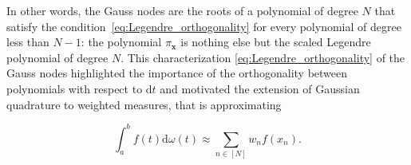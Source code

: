 \documentclass[twoside,11pt]{book}
\numberwithin{theorem}{chapter}
\numberwithin{definition}{chapter}
\numberwithin{proposition}{chapter}
\numberwithin{corollary}{chapter}
\numberwithin{example}{chapter}
\numberwithin{lemma}{chapter}
\begin{document}

 In other words, the Gauss nodes are the roots of a polynomial of degree $N$ that satisfy the condition~\eqref{eq:Legendre_orthogonality} for every polynomial of degree less than $N-1$: the polynomial $\pi_{\bm{x}}$ is nothing else but the scaled Legendre polynomial of degree $N$.
 This characterization \eqref{eq:Legendre_orthogonality} of the Gauss nodes highlighted the importance of the orthogonality between polynomials with respect to $\mathrm{d}t$ and motivated the extension of Gaussian quadrature to weighted measures, that is approximating

\begin{equation}
\int_{a}^{b}f(t)\mathrm{d}\omega(t) \approx \sum\limits_{n \in [N]} w_{n}f(x_{n}).
\end{equation}

\end{document}
